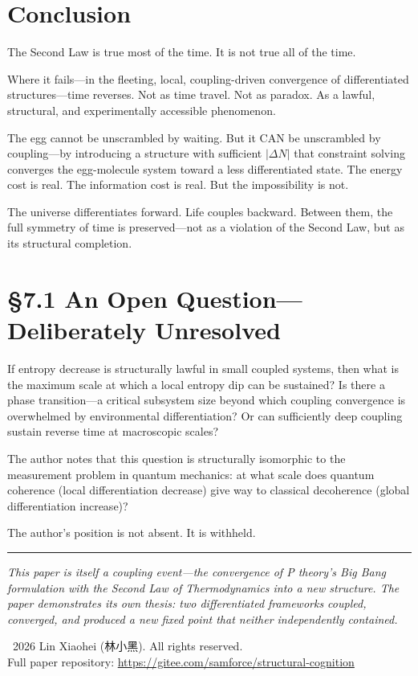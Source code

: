 \documentclass[12pt,a4paper]{article}
\begin{document}
\section{Conclusion}

The Second Law is true most of the time. It is not true all of the time.

Where it fails---in the fleeting, local, coupling-driven convergence of differentiated structures---time reverses. Not as time travel. Not as paradox. As a lawful, structural, and experimentally accessible phenomenon.

The egg cannot be unscrambled by waiting. But it CAN be unscrambled by coupling---by introducing a structure with sufficient $|\Delta N|$ that constraint solving converges the egg-molecule system toward a less differentiated state. The energy cost is real. The information cost is real. But the impossibility is not.

The universe differentiates forward. Life couples backward. Between them, the full symmetry of time is preserved---not as a violation of the Second Law, but as its structural completion.

\section*{§7.1 An Open Question---Deliberately Unresolved}

If entropy decrease is structurally lawful in small coupled systems, then what is the maximum scale at which a local entropy dip can be sustained? Is there a phase transition---a critical subsystem size beyond which coupling convergence is overwhelmed by environmental differentiation? Or can sufficiently deep coupling sustain reverse time at macroscopic scales?

The author notes that this question is structurally isomorphic to the measurement problem in quantum mechanics: at what scale does quantum coherence (local differentiation decrease) give way to classical decoherence (global differentiation increase)?

The author's position is not absent. It is withheld.

\vspace{1em}
\hrule
\vspace{0.5em}
\textit{This paper is itself a coupling event---the convergence of P theory's Big Bang formulation with the Second Law of Thermodynamics into a new structure. The paper demonstrates its own thesis: two differentiated frameworks coupled, converged, and produced a new fixed point that neither independently contained.}

\vspace{1em}
\textcopyright\ 2026 Lin Xiaohei (林小黑). All rights reserved.\\
Full paper repository: \url{https://gitee.com/samforce/structural-cognition}
\end{document}
